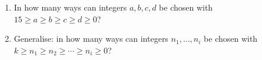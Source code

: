 \begin{enumerate}
\item[(a)] In how many ways can integers $a,b,c,d$ be chosen with $15\ge a\ge b\ge c\ge d\ge0$?
\item[(b)] Generalise: in how many ways can integers $n_1,\dots,n_i$ be chosen with $k\ge n_1\ge n_2\ge\cdots\ge n_i\ge0$?
\end{enumerate}
